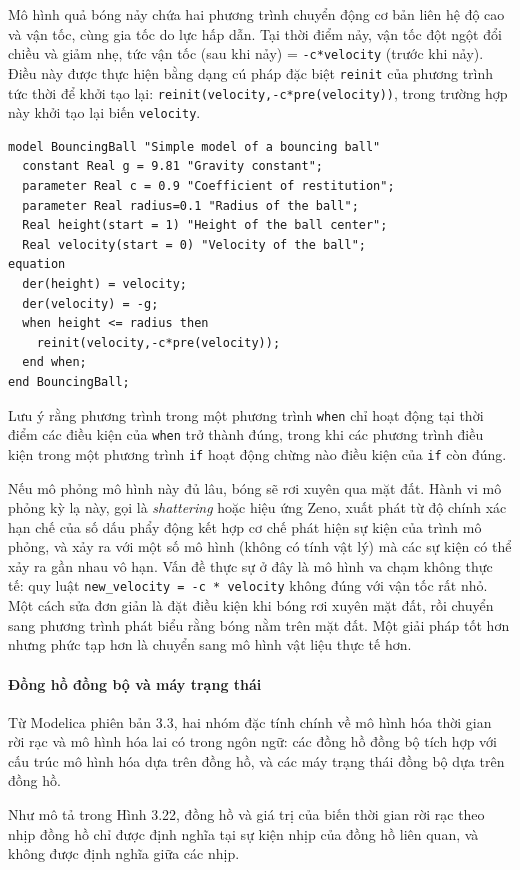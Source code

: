 Mô hình quả bóng nảy chứa hai phương trình chuyển động cơ bản liên hệ độ cao và vận tốc, cùng gia tốc do lực hấp dẫn. Tại thời điểm nảy, vận tốc đột ngột đổi chiều và giảm nhẹ, tức vận tốc (sau khi nảy) = \texttt{-c*velocity} (trước khi nảy). Điều này được thực hiện bằng dạng cú pháp đặc biệt \texttt{reinit} của phương trình tức thời để khởi tạo lại: \texttt{reinit(velocity,-c*pre(velocity))}, trong trường hợp này khởi tạo lại biến \texttt{velocity}.
\begin{verbatim}
model BouncingBall "Simple model of a bouncing ball"
  constant Real g = 9.81 "Gravity constant";
  parameter Real c = 0.9 "Coefficient of restitution";
  parameter Real radius=0.1 "Radius of the ball";
  Real height(start = 1) "Height of the ball center";
  Real velocity(start = 0) "Velocity of the ball";
equation
  der(height) = velocity;
  der(velocity) = -g;
  when height <= radius then
    reinit(velocity,-c*pre(velocity));
  end when;
end BouncingBall;
\end{verbatim}
Lưu ý rằng phương trình trong một phương trình \texttt{when} chỉ hoạt động tại thời điểm các điều kiện của \texttt{when} trở thành đúng, trong khi các phương trình điều kiện trong một phương trình \texttt{if} hoạt động chừng nào điều kiện của \texttt{if} còn đúng.

Nếu mô phỏng mô hình này đủ lâu, bóng sẽ rơi xuyên qua mặt đất. Hành vi mô phỏng kỳ lạ này, gọi là \emph{shattering} hoặc hiệu ứng Zeno, xuất phát từ độ chính xác hạn chế của số dấu phẩy động kết hợp cơ chế phát hiện sự kiện của trình mô phỏng, và xảy ra với một số mô hình (không có tính vật lý) mà các sự kiện có thể xảy ra gần nhau vô hạn. Vấn đề thực sự ở đây là mô hình va chạm không thực tế: quy luật \texttt{new\_velocity = -c * velocity} không đúng với vận tốc rất nhỏ. Một cách sửa đơn giản là đặt điều kiện khi bóng rơi xuyên mặt đất, rồi chuyển sang phương trình phát biểu rằng bóng nằm trên mặt đất. Một giải pháp tốt hơn nhưng phức tạp hơn là chuyển sang mô hình vật liệu thực tế hơn.

\paragraph*{Đồng hồ đồng bộ và máy trạng thái}
Từ Modelica phiên bản 3.3, hai nhóm đặc tính chính về mô hình hóa thời gian rời rạc và mô hình hóa lai có trong ngôn ngữ: các đồng hồ đồng bộ tích hợp với cấu trúc mô hình hóa dựa trên đồng hồ, và các máy trạng thái đồng bộ dựa trên đồng hồ.

Như mô tả trong Hình 3.22, đồng hồ và giá trị của biến thời gian rời rạc theo nhịp đồng hồ chỉ được định nghĩa tại sự kiện nhịp của đồng hồ liên quan, và không được định nghĩa giữa các nhịp.

